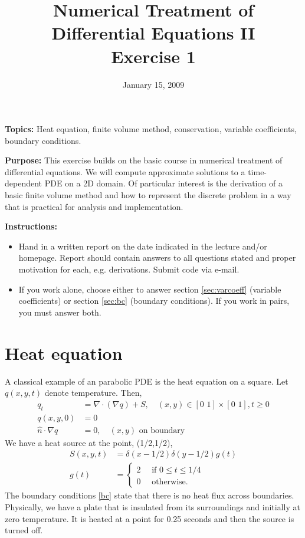 \documentclass[11pt, a4paper]{article}
\title{Numerical Treatment of Differential Equations II \\ Exercise 1}
\date{January 15, 2009}
\begin{document}
\maketitle 

{\bf Topics:} Heat equation, finite volume method, conservation,
variable coefficients, boundary conditions.

{\bf Purpose:} This exercise builds on the basic course in numerical
treatment of differential equations. We will compute approximate
solutions to a time-dependent PDE on a 2D domain. Of particular
interest is the derivation of a basic finite volume method and how to
represent the discrete problem in a way that is practical for analysis
and implementation.

{\bf Instructions: } 
\begin{itemize}
\item Hand in a written report on the date indicated in the lecture
  and/or homepage. Report should contain answers to all questions
  stated and proper motivation for each, e.g. derivations. Submit code
  via e-mail.
\item If you work alone, choose either to answer section
  \ref{sec:varcoeff} (variable coefficients) or section \ref{sec:bc}
  (boundary conditions). If you work in pairs, you must answer both.
\end{itemize}

\section{Heat equation}
A classical example of an parabolic PDE is the heat equation on a square. Let
$q(x,y,t)$ denote temperature. Then,
\begin{align}
  q_t &= \nabla \cdot (\nabla q) + S, \quad (x,y) \in [0 \,\, 1] \times [0 \,\, 1], t \geq 0 \label{pde}\\
  q(x,y,0) &= 0\\
  \hat{n}\cdot \nabla q &= 0, \quad (x,y) \text{ on boundary} \label{bc}
\end{align}
We have a heat source at the point, (1/2,1/2),
\begin{align*}
  S(x,y,t) & = \delta(x-1/2) \delta(y-1/2) g(t)\\
  g(t) & =
  \begin{cases}
    2\quad \text{ if } 0 \leq t \leq 1/4 \\
    0\quad \text{ otherwise}.
  \end{cases}
\end{align*}
The boundary conditions \eqref{bc} state that there
is no heat flux across boundaries. Physically, we have a plate that is
insulated from its surroundings and initially at zero temperature. It
is heated at a point for 0.25 seconds and then the source is turned
off.
\end{document}
